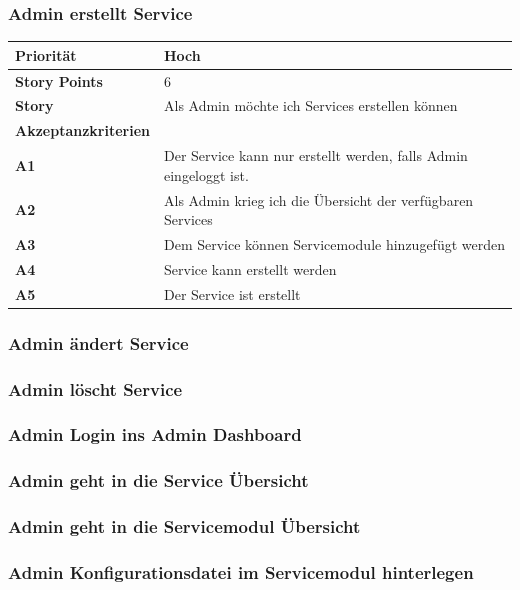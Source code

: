 \documentclass[11pt]{scrartcl}
\begin{document}
 
 \subsubsection{Admin erstellt Service}
 \begin{tabularx}{\linewidth}{l X}
  \textbf{Priorität} & Hoch\\
  \hline
  \textbf{Story Points} & 6\\
  \hline
  \textbf{Story}& Als Admin möchte ich Services erstellen können\\
  \hline
    \textbf{Akzeptanzkriterien} & \\
    \hline
      \textbf{A1} & Der Service kann nur erstellt werden, falls Admin eingeloggt ist.\\
  \hline
  \textbf{A2} & Als Admin krieg ich die Übersicht der verfügbaren Services\\
  \hline
    \textbf{A3} & Dem Service können Servicemodule hinzugefügt werden\\
  \hline
  \textbf{A4} & Service kann erstellt werden\\
  \hline
    \textbf{A5} & Der Service ist erstellt\\
  \hline
 \end{tabularx}
 
 \subsubsection{Admin ändert Service}


 \subsubsection{Admin löscht Service}
 
 \subsubsection{Admin Login ins Admin Dashboard}

 \subsubsection{Admin geht in die Service Übersicht}

 \subsubsection{Admin geht in die Servicemodul Übersicht}

 \subsubsection{Admin Konfigurationsdatei im Servicemodul hinterlegen}
\end{document}

